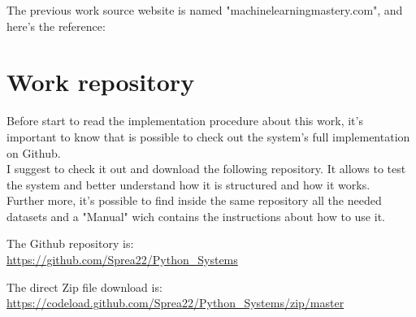 The previous work source website is named "machinelearningmastery.com", and here's the reference: \cite{previousWork}


\section{Work repository}
\label{Repository}
Before start to read the implementation procedure about this work, it's important to know that is possible to check out the system's full implementation on Github.\\
I suggest to check it out and download the following repository. It allows to test the system and better understand how it is structured and how it works.\\
Further more, it's possible to find inside the same repository all the needed datasets and a "Manual" wich contains the instructions about how to use it.

The Github repository is:\\
\url{https://github.com/Sprea22/Python_Systems}

The direct Zip file download is:\\
\url{https://codeload.github.com/Sprea22/Python_Systems/zip/master}

